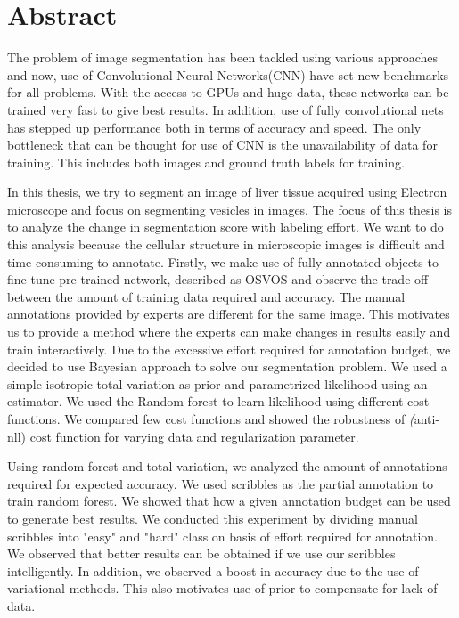 %

\newpage
\vspace{3cm}

\chapter*{Abstract}
The problem of image segmentation has been tackled using various approaches and now, use of Convolutional Neural Networks(CNN) have set new benchmarks for all problems. With the access to GPUs and huge data, these networks can be trained very fast to give best results. In addition, use of fully convolutional nets has stepped up performance both in terms of accuracy and speed. The only bottleneck that can be thought for use of CNN is the unavailability of data for training. This includes both images and ground truth labels for training. \par 
In this thesis, we try to segment an image of liver tissue acquired using Electron microscope and focus on segmenting vesicles in images. The focus of this thesis is to analyze the change in segmentation score with labeling effort. We want to do this analysis because the cellular structure in microscopic images is difficult and time-consuming to annotate. Firstly, we make use of fully annotated objects to fine-tune pre-trained network, described as OSVOS and observe the trade off between the amount of training data required and accuracy.
The manual annotations provided by experts are different for the same image. This motivates us to provide a method where the experts can make changes in results easily and train interactively. Due to the excessive effort required for annotation budget, we decided to use Bayesian approach to solve our segmentation problem. We used a simple isotropic total variation as prior and parametrized likelihood using an estimator. We used the Random forest to learn likelihood using different cost functions. We compared few cost functions and showed the robustness of \textit(anti-nll) cost function for varying data and regularization parameter. \par
Using random forest and total variation, we analyzed the amount of annotations required for expected accuracy. We used scribbles as the partial annotation to train random forest. We showed that how a given annotation budget can be used to generate best results. We conducted this experiment by dividing manual scribbles into "easy" and "hard" class on basis of effort required for annotation. We observed that better results can be obtained if we use our scribbles intelligently. In addition, we observed a boost in accuracy due to the use of variational methods. This also motivates use of prior to compensate for lack of data.\par
